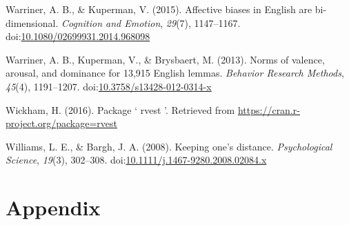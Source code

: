 \documentclass[english,,man]{apa6}
\begin{document}
\hypertarget{ref-Warriner2015}{}
Warriner, A. B., \& Kuperman, V. (2015). Affective biases in English are
bi-dimensional. \emph{Cognition and Emotion}, \emph{29}(7), 1147--1167.
doi:\href{https://doi.org/10.1080/02699931.2014.968098}{10.1080/02699931.2014.968098}

\hypertarget{ref-Warriner2013}{}
Warriner, A. B., Kuperman, V., \& Brysbaert, M. (2013). Norms of
valence, arousal, and dominance for 13,915 English lemmas.
\emph{Behavior Research Methods}, \emph{45}(4), 1191--1207.
doi:\href{https://doi.org/10.3758/s13428-012-0314-x}{10.3758/s13428-012-0314-x}

\hypertarget{ref-Wickham2016}{}
Wickham, H. (2016). Package ` rvest '. Retrieved from
\url{https://cran.r-project.org/package=rvest}

\hypertarget{ref-Williams2008}{}
Williams, L. E., \& Bargh, J. A. (2008). Keeping one's distance.
\emph{Psychological Science}, \emph{19}(3), 302--308.
doi:\href{https://doi.org/10.1111/j.1467-9280.2008.02084.x}{10.1111/j.1467-9280.2008.02084.x}

\endgroup

\newpage

\section{Appendix}\label{appendix}
\end{document}
